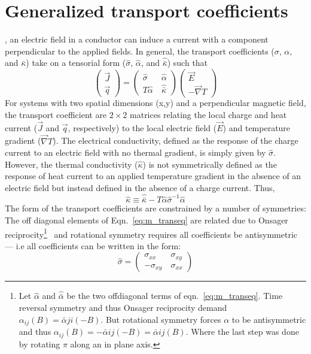 \section{Generalized transport coefficients}
, an electric field in a conductor can induce a current with a component perpendicular to the applied fields. In general, the transport coefficients ($\sigma$, $\alpha$, and $\bar\kappa$) take on a tensorial form ($\hat\sigma$, $\hat\alpha$, and $\hat{\bar\kappa}$) such that
\begin{equation}
\left( \begin{array}{c} \vec J  \\ \vec q \end{array}\right) =  \left( \begin{array}{cc} \hat\sigma   &\  \hat\alpha \\  T\hat\alpha   &\ \hat{\bar\kappa}  \end{array}\right)\left( \begin{array}{c}  \vec E \\  -\vec\nabla T  \end{array}\right)   \label{eq:m_transeq}
\end{equation}
For systems with two spatial dimensions (x,y) and a perpendicular magnetic field, the transport coefficient are $2\times 2$ matrices relating the local charge and heat current ($\vec J$ and $\vec q$, respectively) to the local electric field ($\vec E$) and temperature gradient ($\vec\nabla T$). The electrical conductivity, defined as the response of the charge current to an electric field with no thermal gradient, is simply given by $\hat\sigma$. However, the thermal conductivity ($\hat\kappa$) is not symmetrically defined as the response of heat current to an applied temperature gradient in the absence of an electric field but instead defined in the absence of a charge current. Thus,
\begin{equation}
\hat\kappa \equiv \hat{\bar\kappa}-T\hat\alpha\hat\sigma^{-1}\hat\alpha
\end{equation}
The form of the transport coefficients are constrained by a number of symmetries: The off diagonal elements of Eqn.~\ref{eq:m_transeq} are related due to Onsager reciprocity\footnote{Let $\hat\alpha$ and $\hat{\bar\alpha}$ be the two offdiagonal terms of eqn.~\ref{eq:m_transeq}. Time reversal symmetry and thus Onsager reciprocity demand ${\alpha_{ij}(B)=\bar\alpha{ji}(-B)}$. But rotational symmetry forces $\alpha$ to be antisymmetric and thus ${\alpha_{ij}(B)=-\bar\alpha{ij}(-B)=\bar\alpha{ij}(B)}$. Where the last step was done by rotating $\pi$ along an in plane axis.}~\cite{mazur_onsagers_1953, smrcka_transport_1977} and rotational symmetry requires all coefficients be antisymmetric --- i.e all coefficients can be written in the form:
\begin{equation}
\hat\sigma=\left( \begin{array}{cc} \sigma_{xx}  &\  \sigma_{xy} \\ -\sigma_{xy}  &\ \sigma_{xx} \end{array}\right)
\end{equation}

